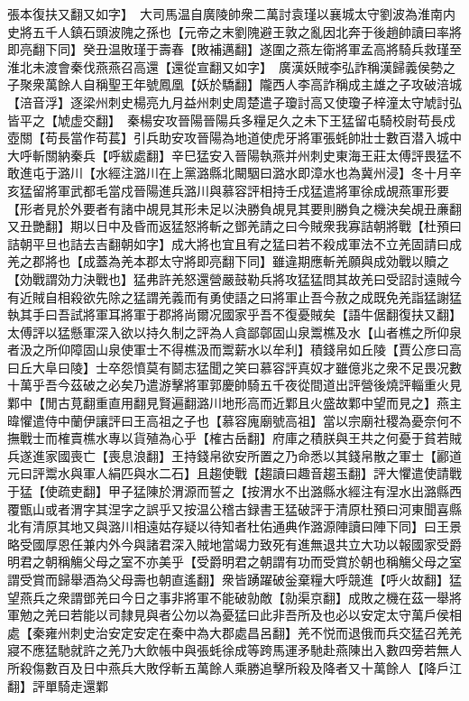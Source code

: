 張本復扶又翻又如字】　大司馬温自廣陵帥衆二萬討袁瑾以襄城太守劉波為淮南内史將五千人鎮石頭波隗之孫也【元帝之末劉隗避王敦之亂因北奔于後趙帥讀曰率將即亮翻下同】癸丑温敗瑾于壽春【敗補邁翻】遂圍之燕左衛將軍孟高將騎兵救瑾至淮北未渡會秦伐燕燕召高還【還從宣翻又如字】　廣漢妖賊李弘詐稱漢歸義侯勢之子聚衆萬餘人自稱聖王年號鳳凰【妖於驕翻】隴西人李高詐稱成主雄之子攻破涪城【涪音浮】逐梁州刺史楊亮九月益州刺史周楚遣子瓊討高又使瓊子梓潼太守虓討弘皆平之【虓虚交翻】　秦楊安攻晉陽晉陽兵多糧足久之未下王猛留屯騎校尉苟長戍壺關【苟長當作苟萇】引兵助安攻晉陽為地道使虎牙將軍張蚝帥壯士數百潜入城中大呼斬關納秦兵【呼紱處翻】辛巳猛安入晉陽執燕并州刺史東海王莊太傅評畏猛不敢進屯于潞川【水經注潞川在上黨潞縣北闞駰曰潞水即漳水也為冀州浸】冬十月辛亥猛留將軍武都毛當戍晉陽進兵潞川與慕容評相持壬戍猛遣將軍徐成覘燕軍形要【形者見於外要者有諸中覘見其形未足以決勝負覘見其要則勝負之機決矣覘丑亷翻又丑艷翻】期以日中及昏而返猛怒將斬之鄧羌請之曰今賊衆我寡詰朝將戰【杜預曰詰朝平旦也詰去吉翻朝如字】成大將也宜且宥之猛曰若不殺成軍法不立羌固請曰成羌之郡將也【成蓋為羌本郡太守將即亮翻下同】雖違期應斬羌願與成効戰以贖之【効戰謂効力決戰也】猛弗許羌怒還營嚴鼓勒兵將攻猛猛問其故羌曰受詔討遠賊今有近賊自相殺欲先除之猛謂羌義而有勇使語之曰將軍止吾今赦之成既免羌詣猛謝猛執其手曰吾試將軍耳將軍于郡將尚爾况國家乎吾不復憂賊矣【語牛倨翻復扶又翻】太傅評以猛懸軍深入欲以持久制之評為人貪鄙鄣固山泉鬻樵及水【山者樵之所仰泉者汲之所仰障固山泉使軍士不得樵汲而鬻薪水以牟利】積錢帛如丘陵【賈公彦曰高曰丘大阜曰陵】士卒怨憤莫有鬬志猛聞之笑曰慕容評真奴才雖億兆之衆不足畏况數十萬乎吾今茲破之必矣乃遣游擊將軍郭慶帥騎五千夜從間道出評營後燒評輜重火見鄴中【閒古莧翻重直用翻見賢遍翻潞川地形高而近鄴且火盛故鄴中望而見之】燕主暐懼遣侍中蘭伊讓評曰王高祖之子也【慕容廆廟號高祖】當以宗廟社稷為憂奈何不撫戰士而榷賣樵水專以貨殖為心乎【榷古岳翻】府庫之積朕與王共之何憂于貧若賊兵遂進家國喪亡【喪息浪翻】王持錢帛欲安所置之乃命悉以其錢帛散之軍士【酈道元曰評鬻水與軍人絹匹與水二石】且趨使戰【趨讀曰趣音趨玉翻】評大懼遣使請戰于猛【使疏吏翻】甲子猛陳於渭源而誓之【按渭水不出潞縣水經注有涅水出潞縣西覆甑山或者渭字其涅字之誤乎又按温公稽古録書王猛破評于清原杜預曰河東聞喜縣北有清原其地又與潞川相遠姑存疑以待知者杜佑通典作潞源陣讀曰陣下同】曰王景略受國厚恩任兼内外今與諸君深入賊地當竭力致死有進無退共立大功以報國家受爵明君之朝稱觴父母之室不亦美乎【受爵明君之朝謂有功而受賞於朝也稱觴父母之室謂受賞而歸舉酒為父母壽也朝直遙翻】衆皆踴躍破釡棄糧大呼競進【呼火故翻】猛望燕兵之衆謂鄧羌曰今日之事非將軍不能破勍敵【勍渠京翻】成敗之機在茲一舉將軍勉之羌曰若能以司隸見與者公勿以為憂猛曰此非吾所及也必以安定太守萬戶侯相處【秦雍州刺史治安定安定在秦中為大郡處昌呂翻】羌不悦而退俄而兵交猛召羌羌寢不應猛馳就許之羌乃大飲帳中與張蚝徐成等跨馬運矛馳赴燕陳出入數四旁若無人所殺傷數百及日中燕兵大敗俘斬五萬餘人乘勝追擊所殺及降者又十萬餘人【降戶江翻】評單騎走還鄴

